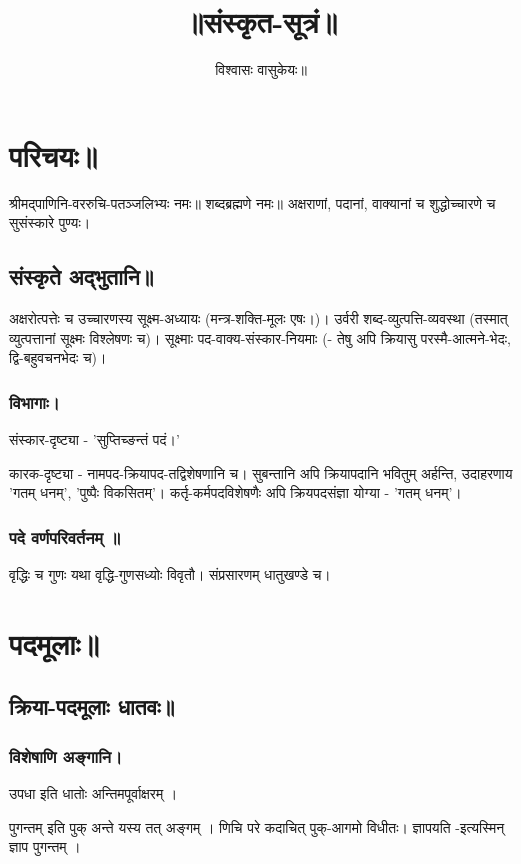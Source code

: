 \documentclass[oneside, article]{memoir}
\title{॥संस्कृत-सूत्रं॥}
\author{विश्वासः वासुकेयः॥}
\begin{document}
\maketitle

\part{परिचयः॥}
श्रीमद्पाणिनि-वररुचि-पतञ्जलिभ्यः नमः॥ शब्दब्रह्मणे नमः॥ अक्षराणां, पदानां, वाक्यानां च शुद्धोच्चारणे च सुसंस्कारे पुण्यः।

\chapter{संस्कृते अद्भुतानि॥}
अक्षरोत्पत्तेः च उच्चारणस्य सूक्ष्म-अध्यायः (मन्त्र-शक्ति-मूलः एषः।)। उर्वरी शब्द-व्युत्पत्ति-व्यवस्था (तस्मात् व्युत्पत्तानां सूक्ष्मः विश्लेषणः च)। सूक्ष्माः पद-वाक्य-संस्कार-नियमाः (- तेषु अपि क्रियासु परस्मै-आत्मने-भेदः, द्वि-बहुवचनभेदः च)।

\section{विभागाः।}
संस्कार-दृष्ट्या - 'सुप्तिच्ङन्तं पदं।'

कारक-दृष्ट्या - नामपद-क्रियापद-तद्विशेषणानि च। सुबन्तानि अपि क्रियापदानि भवितुम् अर्हन्ति, उदाहरणाय 'गतम् धनम्', 'पुष्पैः विकसितम्'। कर्तृ-कर्मपदविशेषणैः अपि क्रियपदसंज्ञा योग्या  - 'गतम् धनम्'।

\section{पदे वर्णपरिवर्तनम् ॥}
वृद्धिः च गुणः‌ यथा वृद्धि-गुणसध्योः विवृतौ। संप्रसारणम् धातुखण्डे च।

\part{पदमूलाः॥}
\chapter{क्रिया-पदमूलाः धातवः॥}
\section{विशेषाणि अङ्गानि।}
उपधा इति धातोः अन्तिमपूर्वाक्षरम् ।

पुगन्तम् इति पुक् अन्ते यस्य तत् अङ्गम् । णिचि परे कदाचित् पुक्-आगमो विधीतः। ज्ञापयति -इत्यस्मिन् ज्ञाप पुगन्तम् ।
\end{document}
